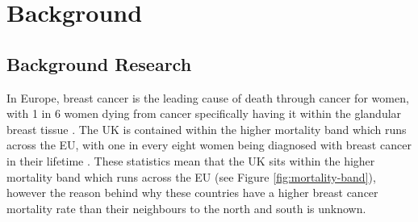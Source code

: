 \chapter{Background}

\section{Background Research}


In Europe, breast cancer is the leading cause of death through cancer for women, with 1 in 6 women dying from cancer specifically having it within the glandular breast tissue \cite{European_Commission_2009}. The UK is contained within the higher mortality band which runs across the EU, with one in every eight women being diagnosed with breast cancer in their lifetime \cite{Breast_cancer_statistics_2015}. These statistics mean that the UK sits within the higher mortality band which runs across the EU (see Figure \ref{fig:mortality-band}), however the reason behind why these countries have a higher breast cancer mortality rate than their neighbours to the north and south is unknown.

